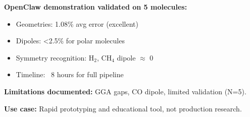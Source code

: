 \documentclass[11pt,a4paper]{article}
\begin{document}
\textbf{OpenClaw demonstration validated on 5 molecules:}
\begin{itemize}
    \item Geometries: 1.08\% avg error (excellent)
    \item Dipoles: <2.5\% for polar molecules
    \item Symmetry recognition: H$_2$, CH$_4$ dipole $\approx$ 0
    \item Timeline: ~8 hours for full pipeline
\end{itemize}

\textbf{Limitations documented:} GGA gaps, CO dipole, limited validation (N=5).

\textbf{Use case:} Rapid prototyping and educational tool, not production research.
\end{document}
